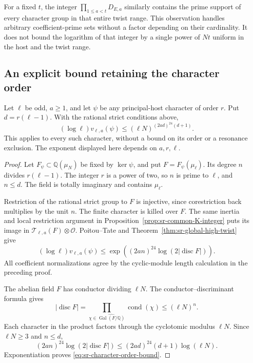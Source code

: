 For a fixed \(t\), the integer
\(\prod_{1\leq a<t}D_{E,a}\) similarly contains the prime support
of every character group in that entire twist range.
This observation handles arbitrary coefficient-prime sets without
a factor depending on their cardinality.
It does not bound the logarithm of that integer by a single power
of \(Nt\) uniform in the host and the twist range.

\subsection{An explicit bound retaining the character order}
\label{sec:sr-character-order-bound}
\begin{srproposition}\label{prop:sr-character-order-bound}
Let \(\ell\) be odd, \(a\geq1\), and let \(\psi\) be any
principal-host character of order \(r\).
Put \(d=r(\ell-1)\). With the rational strict conditions above,
\begin{equation}\label{eq:sr-character-order-bound}
       (\log\ell)v_{\ell,a}(\psi)
          \leq(\ell N)^{(2ad)^{24}(d+1)}.
\end{equation}
This applies to every such character, without a bound on its
order or a resonance exclusion.
The exponent displayed here depends on \(a,r,\ell\).
\end{srproposition}
\begin{proof}
Let \(F_\psi\subset\mathbb Q(\mu_N)\) be fixed by
\(\ker\psi\), and put \(F=F_\psi(\mu_\ell)\).
Its degree \(n\) divides \(r(\ell-1)\).
The integer \(r\) is a power of two, so \(n\) is prime to
\(\ell\), and \(n\leq d\).
The field is totally imaginary and contains \(\mu_\ell\).

Restriction of the rational strict group to \(F\) is injective,
since corestriction back multiplies by the unit \(n\).
The finite character is killed over \(F\).
The same inertia and local restriction argument in
Proposition~\ref{prop:sr-common-K-integer} puts its image in
\(\mathcal T_{\ell,a}(F)\otimes\mathcal O\).
Poitou--Tate and Theorem~\ref{thm:sr-global-high-twist} give
\[
       (\log\ell)v_{\ell,a}(\psi)
           \leq\exp((2an)^{24}\log(2|\operatorname{disc}F|)).
\]
All coefficient normalizations agree by the cyclic-module length
calculation in the preceding proof.

The abelian field \(F\) has conductor dividing \(\ell N\).
The conductor--discriminant formula gives
\[
 |\operatorname{disc}F|
       =\prod_{\chi\in\widehat{\operatorname{Gal}(F/\mathbb Q)}}
                                  \operatorname{cond}(\chi)
       \leq(\ell N)^n.
\]
Each character in the product factors through the cyclotomic
modulus \(\ell N\).
Since \(\ell N\geq3\) and \(n\leq d\),
\[
 (2an)^{24}\log(2|\operatorname{disc}F|)
       \leq (2ad)^{24}(d+1)\log(\ell N).
\]
Exponentiation proves \eqref{eq:sr-character-order-bound}.
\end{proof}

